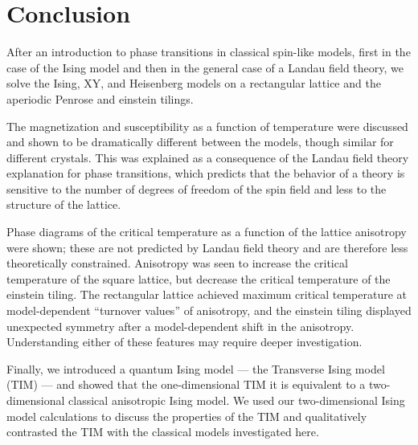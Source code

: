 \documentclass[
  amsmath,
  amssymb,
  aps,
  twocolumn,
  nofootinbib,
  nolongbibliography,
  floatfix,
]{revtex4-2}
\begin{document}
\section{Conclusion}
\label{sec:conclusion}
After an introduction to phase transitions in classical spin-like models, first in the case of the Ising model and then in the general case of a Landau field theory, we solve the Ising, XY, and Heisenberg models on a rectangular lattice and the aperiodic Penrose and einstein tilings.

The magnetization and susceptibility as a function of temperature were discussed and shown to be dramatically different between the models, though similar for different crystals. This was explained as a consequence of the Landau field theory explanation for phase transitions, which predicts that the behavior of a theory is sensitive to the number of degrees of freedom of the spin field and less to the structure of the lattice.

Phase diagrams of the critical temperature as a function of the lattice anisotropy were shown; these are not predicted by Landau field theory and are therefore less theoretically constrained.  Anisotropy was seen to increase the critical temperature of the square lattice, but decrease the critical temperature of the einstein tiling. The rectangular lattice achieved maximum critical temperature at model-dependent ``turnover values'' of anisotropy, and the einstein tiling displayed unexpected symmetry after a model-dependent shift in the anisotropy. Understanding either of these features may require deeper investigation.

Finally, we introduced a quantum Ising model --- the Transverse Ising model (TIM) --- and showed that the one-dimensional TIM it is equivalent to a two-dimensional classical anisotropic Ising model. We used our two-dimensional Ising model calculations to discuss the properties of the TIM and qualitatively contrasted the TIM with the classical models investigated here.


\end{document}
